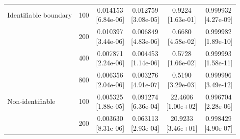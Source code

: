 \documentclass[12pt,letterpaper]{article}
\theoremstyle{plain}
\theoremstyle{definition}
\begin{document}
\begin{table}[p]
\begin{adjustbox}{max width=\linewidth}
\begin{tabular}{lrcccc}
\addlinespace
Identifiable boundary & 100 & \shortstack{0.014153\\[-1pt]{\scriptsize[6.84e-06]}} & \shortstack{0.012759\\[-1pt]{\scriptsize[3.08e-05]}} & \shortstack{0.9224\\[-1pt]{\scriptsize[1.63e-01]}} & \shortstack{0.999932\\[-1pt]{\scriptsize[4.27e-09]}}\\
 & 200 & \shortstack{0.010397\\[-1pt]{\scriptsize[3.44e-06]}} & \shortstack{0.006849\\[-1pt]{\scriptsize[4.83e-06]}} & \shortstack{0.6680\\[-1pt]{\scriptsize[4.58e-02]}} & \shortstack{0.999982\\[-1pt]{\scriptsize[1.89e-10]}}\\
 & 400 & \shortstack{0.007871\\[-1pt]{\scriptsize[2.24e-06]}} & \shortstack{0.004453\\[-1pt]{\scriptsize[1.14e-06]}} & \shortstack{0.5728\\[-1pt]{\scriptsize[1.66e-02]}} & \shortstack{0.999993\\[-1pt]{\scriptsize[1.58e-11]}}\\
 & 800 & \shortstack{0.006356\\[-1pt]{\scriptsize[2.04e-06]}} & \shortstack{0.003276\\[-1pt]{\scriptsize[4.91e-07]}} & \shortstack{0.5190\\[-1pt]{\scriptsize[3.29e-03]}} & \shortstack{0.999996\\[-1pt]{\scriptsize[3.49e-12]}}\\
\addlinespace
Non-identifiable & 100 & \shortstack{0.005325\\[-1pt]{\scriptsize[1.88e-05]}} & \shortstack{0.091274\\[-1pt]{\scriptsize[6.36e-04]}} & \shortstack{22.4606\\[-1pt]{\scriptsize[1.00e+02]}} & \shortstack{0.996704\\[-1pt]{\scriptsize[2.28e-06]}}\\
 & 200 & \shortstack{0.003630\\[-1pt]{\scriptsize[8.31e-06]}} & \shortstack{0.063113\\[-1pt]{\scriptsize[2.93e-04]}} & \shortstack{20.9233\\[-1pt]{\scriptsize[3.46e+01]}} & \shortstack{0.998429\\[-1pt]{\scriptsize[4.90e-07]}}\\

\end{tabular}
\end{adjustbox}
\end{table}
\end{document}
